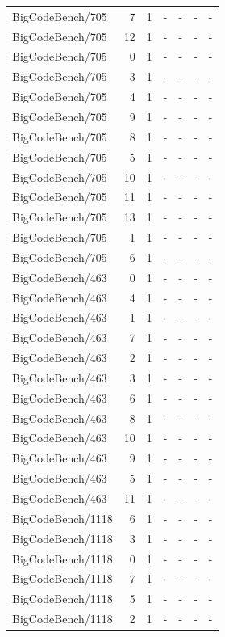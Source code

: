 \begin{longtable}{lrrllll}
BigCodeBench/705 & 7 & 1 & - & - & - & - \\
BigCodeBench/705 & 12 & 1 & - & - & - & - \\
BigCodeBench/705 & 0 & 1 & - & - & - & - \\
BigCodeBench/705 & 3 & 1 & - & - & - & - \\
BigCodeBench/705 & 4 & 1 & - & - & - & - \\
BigCodeBench/705 & 9 & 1 & - & - & - & - \\
BigCodeBench/705 & 8 & 1 & - & - & - & - \\
BigCodeBench/705 & 5 & 1 & - & - & - & - \\
BigCodeBench/705 & 10 & 1 & - & - & - & - \\
BigCodeBench/705 & 11 & 1 & - & - & - & - \\
BigCodeBench/705 & 13 & 1 & - & - & - & - \\
BigCodeBench/705 & 1 & 1 & - & - & - & - \\
BigCodeBench/705 & 6 & 1 & - & - & - & - \\
BigCodeBench/463 & 0 & 1 & - & - & - & - \\
BigCodeBench/463 & 4 & 1 & - & - & - & - \\
BigCodeBench/463 & 1 & 1 & - & - & - & - \\
BigCodeBench/463 & 7 & 1 & - & - & - & - \\
BigCodeBench/463 & 2 & 1 & - & - & - & - \\
BigCodeBench/463 & 3 & 1 & - & - & - & - \\
BigCodeBench/463 & 6 & 1 & - & - & - & - \\
BigCodeBench/463 & 8 & 1 & - & - & - & - \\
BigCodeBench/463 & 10 & 1 & - & - & - & - \\
BigCodeBench/463 & 9 & 1 & - & - & - & - \\
BigCodeBench/463 & 5 & 1 & - & - & - & - \\
BigCodeBench/463 & 11 & 1 & - & - & - & - \\
BigCodeBench/1118 & 6 & 1 & - & - & - & - \\
BigCodeBench/1118 & 3 & 1 & - & - & - & - \\
BigCodeBench/1118 & 0 & 1 & - & - & - & - \\
BigCodeBench/1118 & 7 & 1 & - & - & - & - \\
BigCodeBench/1118 & 5 & 1 & - & - & - & - \\
BigCodeBench/1118 & 2 & 1 & - & - & - & - \\

\end{longtable}
